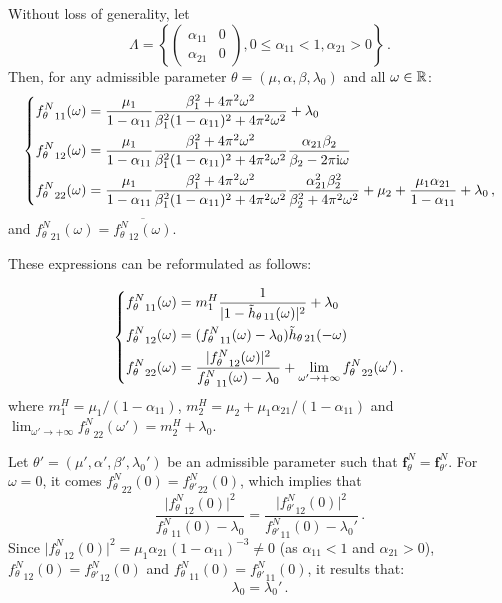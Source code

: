 \begin{subappendices}
Without loss of generality, let 
\[\Lambda = \left\{ \begin{pmatrix} \alpha_{11} & 0 \\ \alpha_{21} & 0 \end{pmatrix}, 0 \le \alpha_{11} < 1, \alpha_{21} > 0 \right\}\,.\]
Then, for any admissible parameter $\theta = (\mu, \alpha, \beta, \lambda_0)$ and all $\omega\in{\mathbb R}$:
\[\begin{dcases}
{f_\theta^N}_{11}(\omega) = \frac{\mu_1}{1-\alpha_{11}}\frac{\beta_1^2 + 4 \pi^2 \omega^2}{\beta_1^2(1-\alpha_{11})^2 + 4\pi^2\omega^2} + \lambda_0\\
{f_\theta^N}_{12}(\omega) = \frac{\mu_1}{1-\alpha_{11}}\frac{\beta_1^2 + 4 \pi^2 \omega^2}{\beta_1^2(1-\alpha_{11})^2 + 4\pi^2\omega^2} \frac{\alpha_{21}\beta_2}{\beta_2 - 2\pi \mathrm{i} \omega}\\
{f_\theta^N}_{22}(\omega) = \frac{\mu_1}{1-\alpha_{11}}\frac{\beta_1^2 + 4 \pi^2 \omega^2}{\beta_1^2(1-\alpha_{11})^2 + 4\pi^2\omega^2} \frac{\alpha_{21}^2\beta_2^2}{\beta_2^2 + 4\pi^2\omega^2} + \mu_2 + \frac{\mu_1 \alpha_{21}}{1-\alpha_{11}} + \lambda_0\,,
\end{dcases}\]
and ${f_\theta^N}_{21}(\omega) = \overline{{f_\theta^N}_{12}(\omega)}$.

These expressions can be reformulated as follows:

\[\begin{dcases}
{f_\theta^N}_{11}(\omega) = m_1^H \frac{1}{\lvert 1 - \tilde h_{\theta \, 11}(\omega)\rvert^2} + \lambda_0\\
{f_\theta^N}_{12}(\omega) = ({f_\theta^N}_{11}(\omega) - \lambda_0)\tilde h_{\theta \, 21}(-\omega)\\
{f_\theta^N}_{22}(\omega) = \frac{\lvert {f_\theta^N}_{12}(\omega)\rvert^2}{{f_\theta^N}_{11}(\omega) - \lambda_0} + \lim_{\omega' \to +\infty}{f_\theta^N}_{22}(\omega')\,.
\end{dcases}\]
where $m_1^H = {\mu_1}/{(1 - \alpha_{11})}$, $m_2^H =  \mu_2 + \mu_1 \alpha_{21} / ( 1 - \alpha_{11} )$ and $\lim_{\omega' \to +\infty}{f_\theta^N}_{22}(\omega') = m_2^H + \lambda_0$.

Let $\theta' = (\mu', \alpha', \beta', \lambda_0')$ be an admissible parameter such that $\mathbf{f}_{\theta}^N = \mathbf{f}_{\theta'}^N$. For $\omega = 0$, it comes
${f_\theta^N}_{22}(0) = {f_{\theta'}^N}_{22}(0)$, which implies that
\[
\frac{\lvert {f_\theta^N}_{12}(0)\rvert^2}{{f_\theta^N}_{11}(0) - \lambda_0} = \frac{\lvert {f_{\theta'}^N}_{12}(0)\rvert^2}{{f_{\theta'}^N}_{11}(0) - \lambda_0'}\,.
\]
Since $\lvert {f_\theta^N}_{12}(0)\rvert^2 = {\mu_1 \alpha_{21}}{(1-\alpha_{11})^{-3}}\neq 0$ (as $\alpha_{11} < 1$ and $\alpha_{21} > 0$),
${f_\theta^N}_{12}(0) = {f_{\theta'}^N}_{12}(0)$
and ${f_\theta^N}_{11}(0) = {f_{\theta'}^N}_{11}(0)$,
it results that: \[\lambda_0 = \lambda_0'\,.\]


\end{subappendices}
